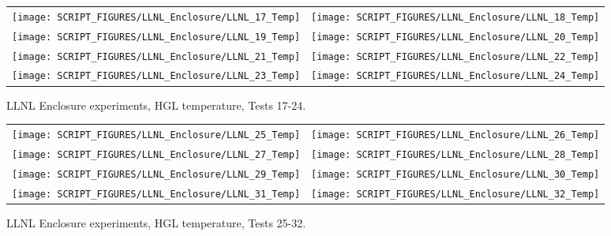 \begin{figure}[p]
\begin{tabular*}{\textwidth}{l@{\extracolsep{\fill}}r}
\texttt{[image: SCRIPT\_FIGURES/LLNL\_Enclosure/LLNL\_17\_Temp]} &
\texttt{[image: SCRIPT\_FIGURES/LLNL\_Enclosure/LLNL\_18\_Temp]} \\
\texttt{[image: SCRIPT\_FIGURES/LLNL\_Enclosure/LLNL\_19\_Temp]} &
\texttt{[image: SCRIPT\_FIGURES/LLNL\_Enclosure/LLNL\_20\_Temp]} \\
\texttt{[image: SCRIPT\_FIGURES/LLNL\_Enclosure/LLNL\_21\_Temp]} &
\texttt{[image: SCRIPT\_FIGURES/LLNL\_Enclosure/LLNL\_22\_Temp]} \\
\texttt{[image: SCRIPT\_FIGURES/LLNL\_Enclosure/LLNL\_23\_Temp]} &
\texttt{[image: SCRIPT\_FIGURES/LLNL\_Enclosure/LLNL\_24\_Temp]}
\end{tabular*}
\caption[LLNL Enclosure experiments, HGL temperature, Tests 17-24]
{LLNL Enclosure experiments, HGL temperature, Tests 17-24.}
\label{LLNL_Enclosure_Temp_3}
\end{figure}

\begin{figure}[p]
\begin{tabular*}{\textwidth}{l@{\extracolsep{\fill}}r}
\texttt{[image: SCRIPT\_FIGURES/LLNL\_Enclosure/LLNL\_25\_Temp]} &
\texttt{[image: SCRIPT\_FIGURES/LLNL\_Enclosure/LLNL\_26\_Temp]} \\
\texttt{[image: SCRIPT\_FIGURES/LLNL\_Enclosure/LLNL\_27\_Temp]} &
\texttt{[image: SCRIPT\_FIGURES/LLNL\_Enclosure/LLNL\_28\_Temp]} \\
\texttt{[image: SCRIPT\_FIGURES/LLNL\_Enclosure/LLNL\_29\_Temp]} &
\texttt{[image: SCRIPT\_FIGURES/LLNL\_Enclosure/LLNL\_30\_Temp]} \\
\texttt{[image: SCRIPT\_FIGURES/LLNL\_Enclosure/LLNL\_31\_Temp]} &
\texttt{[image: SCRIPT\_FIGURES/LLNL\_Enclosure/LLNL\_32\_Temp]}
\end{tabular*}
\caption[LLNL Enclosure experiments, HGL temperature, Tests 25-32]
{LLNL Enclosure experiments, HGL temperature, Tests 25-32.}
\label{LLNL_Enclosure_Temp_4}
\end{figure}

